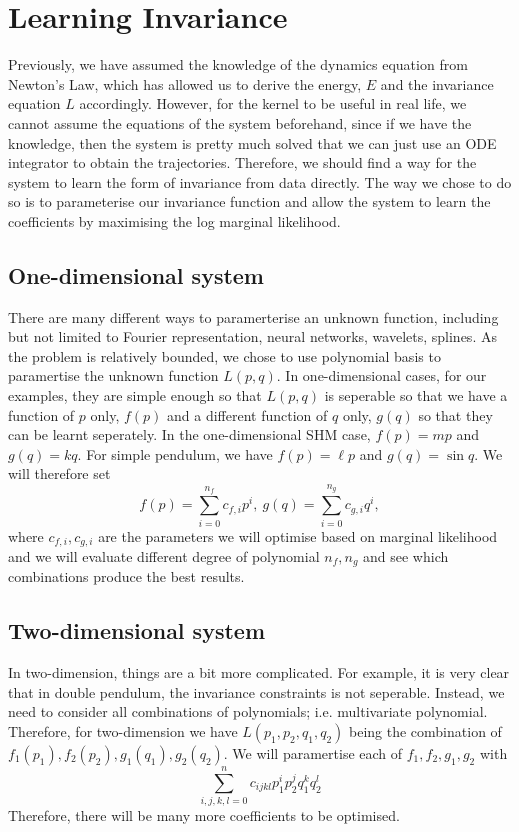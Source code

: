 \documentclass{statsmsc}
\begin{document}
\section{Learning Invariance}
Previously, we have assumed the knowledge of the dynamics equation from Newton's Law, which has allowed us to derive the energy, $E$ and the invariance equation $L$ accordingly. 
However, for the kernel to be useful in real life, we cannot assume the equations of the system beforehand, since if we have the knowledge, then the system is pretty much solved that we can just use an ODE integrator to obtain the trajectories. 
Therefore, we should find a way for the system to learn the form of invariance from data directly.
The way we chose to do so is to parameterise our invariance function and allow the system to learn the coefficients by maximising the log marginal likelihood.

\subsection{One-dimensional system}
There are many different ways to paramerterise an unknown function, including but not limited to Fourier representation, neural networks, wavelets, splines.
As the problem is relatively bounded, we chose to use polynomial basis to paramertise the unknown function $L(p,q)$.
In one-dimensional cases, for our examples, they are simple enough so that $L(p,q)$ is seperable so that we have a function of $p$ only, $f(p)$ and a different function of $q$ only, $g(q)$ so that they can be learnt seperately.
In the one-dimensional SHM case, $f(p)=mp$ and $g(q)=kq$.
For simple pendulum, we have $f(p)=\ell p$ and $g(q)=\sin q$.
We will therefore set $$f(p)=\sum_{i=0}^{n_f}c_{f,i}p^i,\ g(q)=\sum_{i=0}^{n_g}c_{g,i}q^i,$$
where $c_{f,i}, c_{g,i}$ are the parameters we will optimise based on marginal likelihood and we will evaluate different degree of polynomial $n_f, n_g$ and see which combinations produce the best results. 

\subsection{Two-dimensional system}
In two-dimension, things are a bit more complicated. 
For example, it is very clear that in double pendulum, the invariance constraints is not seperable.
Instead, we need to consider all combinations of polynomials; i.e. multivariate polynomial.
Therefore, for two-dimension we have $L(p_1, p_2, q_1, q_2)$ being the combination of $f_1(p_1), f_2(p_2), g_1(q_1), g_2(q_2)$.
We will paramertise each of $f_1, f_2, g_1, g_2$ with $$\sum_{i,j,k,l=0}^{n}c_{ijkl}p_1^ip_2^jq_1^kq_2^l$$
Therefore, there will be many more coefficients to be optimised.
\end{document}
